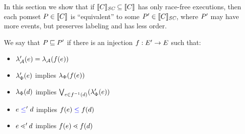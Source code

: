 In this section we show that if $\llbracket C\rrbracket_{\textit{SC}}\subseteq\llbracket C\rrbracket$ has only
race-free executions, then each pomset $P\in\llbracket C\rrbracket$ is ``equivalent''
to some $P'\in\llbracket C\rrbracket_{\textit{SC}}$, where $P'$ may have more events, but
preserves labeling and has less order.

We say that $P\sqsubseteq P'$ if there is an injection
$f:E'\rightarrow E$ such that:
\begin{itemize}
\item $\lambda_{\mathcal{A}}'(e) = \lambda_{\mathcal{A}}(f(e))$
\item $\lambda_{\Phi}'(e)$ implies $\lambda_{\Phi}(f(e))$
\item $\lambda_{\Phi}(d)$ implies $\bigvee_{e\in f^{-1}(d)}(\lambda_{\Phi}'(e))$
\item $e\mathrel{{\color{blue}\leq}}'d$ implies $f(e)\mathrel{{\color{blue}\leq}}f(d)$
\item $e\lessdot'd$ implies $f(e)\lessdot f(d)$
\end{itemize}

